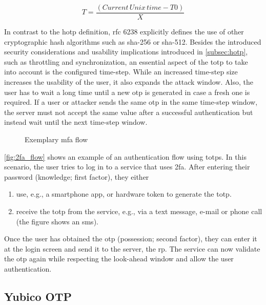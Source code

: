 \begin{equation*}
	T = \frac{(Current\, Unix\, time - T0)}{X}
\end{equation*}

In contrast to the \gls{hotp} definition, \gls{rfc} 6238 explicitly defines the use of other cryptographic hash algorithms such as \gls{sha}-256 or \gls{sha}-512. Besides the introduced security considerations and usability implications introduced in \autoref{subsec:hotp}, such as throttling and synchronization, an essential aspect of the \gls{totp} to take into account is the configured time-step. While an increased time-step size increases the usability of the user, it also expands the attack window. Also, the user has to wait a long time until a new \gls{otp} is generated in case a fresh one is required. If a user or attacker sends the same \gls{otp} in the same time-step window, the server must not accept the same value after a successful authentication but instead wait until the next time-step window.

\begin{figure}[hbt]
	\centering
	
	\caption[Exemplary \gls{mfa} flow]{Exemplary \gls{mfa} flow\footnotemark}
	\label{fig:2fa_flow}
\end{figure}

\autoref{fig:2fa_flow} shows an example of an authentication flow using \glspl{totp}. In this scenario, the user tries to log in to a service that uses \gls{2fa}. After entering their password (knowledge; first factor), they either

\begin{enumerate}[label=(\alph*)]
	\item use, e.g., a smartphone app, or hardware token to generate the \gls{totp}.
	\item receive the \gls{totp} from the service, e.g., via a text message, e-mail or phone call (the figure shows an \gls{sms}).
\end{enumerate}

Once the user has obtained the \gls{otp} (possession; second factor), they can enter it at the login screen and send it to the server, the \gls{rp}. The service can now validate the \gls{otp} again while respecting the look-ahead window and allow the user authentication.

\subsection{Yubico OTP}

